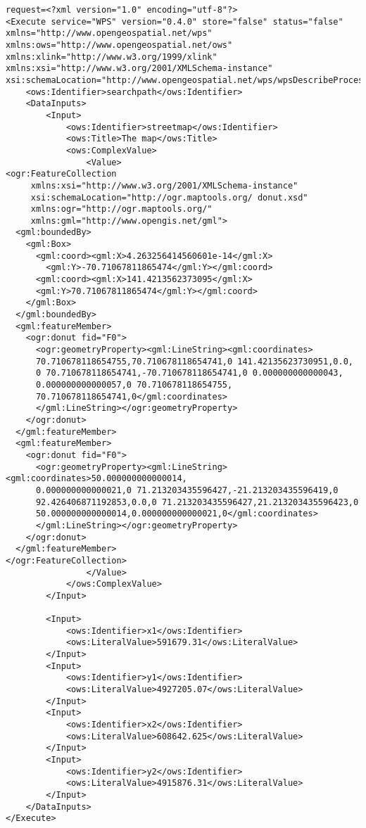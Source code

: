 \documentclass[a4paper,11pt]{article}
\begin{document}
\begin{verbatim}
request=<?xml version="1.0" encoding="utf-8"?>
<Execute service="WPS" version="0.4.0" store="false" status="false"
xmlns="http://www.opengeospatial.net/wps"
xmlns:ows="http://www.opengeospatial.net/ows"
xmlns:xlink="http://www.w3.org/1999/xlink"
xmlns:xsi="http://www.w3.org/2001/XMLSchema-instance"
xsi:schemaLocation="http://www.opengeospatial.net/wps/wpsDescribeProcess.xsd">
    <ows:Identifier>searchpath</ows:Identifier>
    <DataInputs>
        <Input>
            <ows:Identifier>streetmap</ows:Identifier>
            <ows:Title>The map</ows:Title>
            <ows:ComplexValue>
                <Value>
<ogr:FeatureCollection
     xmlns:xsi="http://www.w3.org/2001/XMLSchema-instance"
     xsi:schemaLocation="http://ogr.maptools.org/ donut.xsd"
     xmlns:ogr="http://ogr.maptools.org/"
     xmlns:gml="http://www.opengis.net/gml">
  <gml:boundedBy>
    <gml:Box>
      <gml:coord><gml:X>4.263256414560601e-14</gml:X>
        <gml:Y>-70.71067811865474</gml:Y></gml:coord>
      <gml:coord><gml:X>141.4213562373095</gml:X>
      <gml:Y>70.71067811865474</gml:Y></gml:coord>
    </gml:Box>
  </gml:boundedBy>                      
  <gml:featureMember>
    <ogr:donut fid="F0">
      <ogr:geometryProperty><gml:LineString><gml:coordinates>
      70.710678118654755,70.710678118654741,0 141.42135623730951,0.0,
      0 70.710678118654741,-70.710678118654741,0 0.000000000000043,
      0.000000000000057,0 70.710678118654755,
      70.710678118654741,0</gml:coordinates>
      </gml:LineString></ogr:geometryProperty>
    </ogr:donut>
  </gml:featureMember>
  <gml:featureMember>
    <ogr:donut fid="F0">
      <ogr:geometryProperty><gml:LineString><gml:coordinates>50.000000000000014,
      0.000000000000021,0 71.213203435596427,-21.213203435596419,0 
      92.426406871192853,0.0,0 71.213203435596427,21.213203435596423,0 
      50.000000000000014,0.000000000000021,0</gml:coordinates>
      </gml:LineString></ogr:geometryProperty>
    </ogr:donut>
  </gml:featureMember>
</ogr:FeatureCollection>
                </Value>
            </ows:ComplexValue>
        </Input>

        <Input>
            <ows:Identifier>x1</ows:Identifier>
            <ows:LiteralValue>591679.31</ows:LiteralValue>
        </Input>
        <Input>
            <ows:Identifier>y1</ows:Identifier>
            <ows:LiteralValue>4927205.07</ows:LiteralValue>
        </Input>
        <Input>
            <ows:Identifier>x2</ows:Identifier>
            <ows:LiteralValue>608642.625</ows:LiteralValue>
        </Input>
        <Input>
            <ows:Identifier>y2</ows:Identifier>
            <ows:LiteralValue>4915876.31</ows:LiteralValue>
        </Input>
    </DataInputs>
</Execute>
    \end{verbatim}
     
\end{document}
